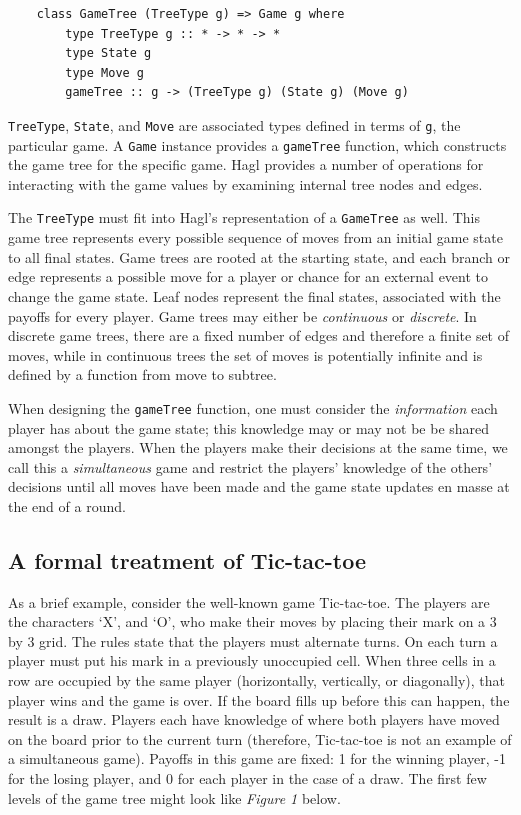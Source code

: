 \documentclass{article}
\begin{document}
\begin{verbatim}
    class GameTree (TreeType g) => Game g where
        type TreeType g :: * -> * -> *
        type State g
        type Move g
        gameTree :: g -> (TreeType g) (State g) (Move g)
\end{verbatim}

\texttt{TreeType}, \texttt{State}, and \texttt{Move} are associated
types defined in terms of \texttt{g}, the particular game. A \texttt{Game}
instance provides a \texttt{gameTree} function, which constructs the
game tree for the specific game. Hagl provides a number of operations
for interacting with the game values by examining internal tree nodes
and edges.

The \texttt{TreeType} must fit into Hagl's representation of a
\texttt{GameTree} as well. This game tree represents every possible
sequence of moves from an initial game state to all final states. Game
trees are rooted at the starting state, and each branch or edge
represents a possible move for a player or chance for an external event
to change the game state. Leaf nodes represent the final states,
associated with the payoffs for every player. Game trees may either be
\emph{continuous} or \emph{discrete}.  In discrete game trees, there
are a fixed number of edges and therefore a finite set of moves, while
in continuous trees the set of moves is potentially infinite and is
defined by a function from move to subtree.

When designing the \texttt{gameTree} function, one must consider the
\emph{information} each player has about the game state; this knowledge
may or may not be be shared amongst the players. When the players make
their decisions at the same time, we call this a \emph{simultaneous}
game and restrict the players' knowledge of the others' decisions until
all moves have been made and the game state updates en masse at the end
of a round.

\subsection{A formal treatment of
Tic-tac-toe}

As a brief example, consider the well-known game Tic-tac-toe.  The players
are the characters `X', and `O', who make their moves by placing their
mark on a 3 by 3 grid. The rules state that the players must alternate
turns. On each turn a player must put his mark in a previously
unoccupied cell. When three cells in a row are occupied by the same
player (horizontally, vertically, or diagonally), that player wins and
the game is over. If the board fills up before this can happen, the
result is a draw. Players each have knowledge of where both players have
moved on the board prior to the current turn (therefore, Tic-tac-toe is
not an example of a simultaneous game). Payoffs in this game are fixed:
1 for the winning player, -1 for the losing player, and 0 for each
player in the case of a draw. The first few levels of the game tree
might look like \emph{Figure 1} below.
\end{document}
